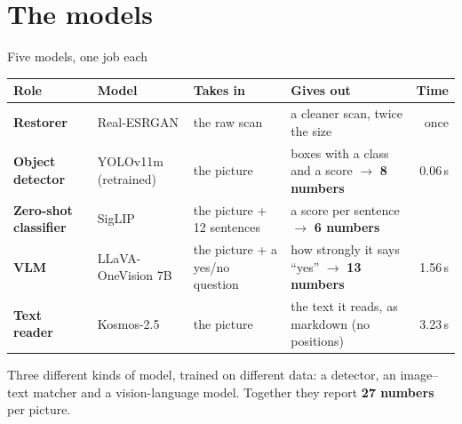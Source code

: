 \documentclass[aspectratio=169,10pt]{beamer}
\newcommand{\takeaway}[1]{\vfill\begin{keybox}#1\end{keybox}}
\begin{document}
\section{The models}

\begin{frame}{Five models, one job each}
\footnotesize
\renewcommand{\arraystretch}{1.2}
\begin{tabularx}{\textwidth}{@{}>{\bfseries}l l X X r@{}}
\toprule
Role & Model & Takes in & Gives out & Time\\
\midrule
\rowcolor{soft}Restorer & Real-ESRGAN & the raw scan & a cleaner scan, twice the size & once\\
\color{agent}Object detector & YOLOv11m (retrained) & the picture & boxes with a class and a score $\to$ \textbf{8 numbers} & 0.06\,s\\
\color{agent}Zero-shot classifier & SigLIP & the picture + 12 sentences & a score per sentence $\to$ \textbf{6 numbers} & \\
\color{agent}VLM & LLaVA-OneVision 7B & the picture + a yes/no question & how strongly it says ``yes'' $\to$ \textbf{13 numbers} & 1.56\,s\\
\rowcolor{soft}\color{tiertwo}Text reader & Kosmos-2.5 & the picture & the text it reads, as markdown (no positions) & 3.23\,s\\
\bottomrule
\end{tabularx}
\par{}
\takeaway{Three different kinds of model, trained on different data: a detector, an image--text matcher and a vision-language model. Together they report \textbf{27 numbers} per picture.}
\end{frame}
\end{document}
